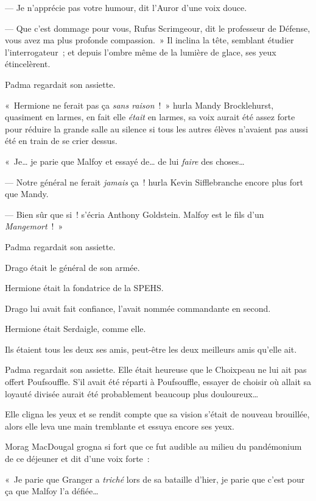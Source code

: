 --- Je n'apprécie pas votre humour, dit l'Auror d'une voix douce.

--- Que c'est dommage pour vous, Rufus Scrimgeour, dit le professeur de Défense, vous avez ma plus profonde compassion.~» Il inclina la tête, semblant étudier l'interrogateur~; et depuis l'ombre même de la lumière de glace, ses yeux étincelèrent.

\later

Padma regardait son assiette.

«~Hermione ne ferait pas ça \emph{sans raison}~!~» hurla Mandy Brocklehurst, quasiment en larmes, en fait elle \emph{était} en larmes, sa voix aurait été assez forte pour réduire la grande salle au silence si tous les autres élèves n'avaient pas aussi été en train de se crier dessus.

«~Je… je parie que Malfoy et essayé de… de lui \emph{faire} des choses…

--- Notre général ne ferait \emph{jamais} ça~! hurla Kevin Sifflebranche encore plus fort que Mandy.

--- Bien sûr que si~! s'écria Anthony Goldstein. Malfoy est le fils d'un \emph{Mangemort}~!~»

\later

Padma regardait son assiette.

Drago était le général de son armée.

Hermione était la fondatrice de la SPEHS.

Drago lui avait fait confiance, l'avait nommée commandante en second.

Hermione était Serdaigle, comme elle.

Ils étaient tous les deux ses amis, peut-être les deux meilleurs amis qu'elle ait.

Padma regardait son assiette. Elle était heureuse que le Choixpeau ne lui ait pas offert Poufsouffle. S'il avait été réparti à Poufsouffle, essayer de choisir où allait sa loyauté divisée aurait été probablement beaucoup plus douloureux…

Elle cligna les yeux et se rendit compte que sa vision s'était de nouveau brouillée, alors elle leva une main tremblante et essuya encore ses yeux.

Morag MacDougal grogna si fort que ce fut audible au milieu du pandémonium de ce déjeuner et dit d'une voix forte~:

«~Je parie que Granger a \emph{triché} lors de sa bataille d'hier, je parie que c'est pour ça que Malfoy l'a défiée…

